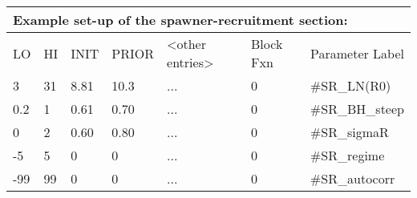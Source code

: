 \begin{center}
	\begin{longtable}{p{1cm} p{1cm} p{1cm}  p{1.5cm}  p{2.5cm}  p{1.5cm}  p{4.5cm}  }
		
		\multicolumn{7}{l}{Example set-up of the spawner-recruitment section:}\\
		\hline
		LO & HI & INIT & PRIOR &  <other entries> & Block Fxn & Parameter Label \\
		\hline
		3    & 31 & 8.81 & 10.3 & ... & 0 & \#SR\_LN(R0) \\
		0.2  & 1  & 0.61 & 0.70 & ... & 0 & \#SR\_BH\_steep \\
		0    & 2  & 0.60 & 0.80 & ... & 0 & \#SR\_sigmaR \\
		-5   & 5  & 0    & 0    & ... & 0 & \#SR\_regime\\
		-99  & 99 & 0    & 0    & ... & 0 & \#SR\_autocorr  \\
		\hline
	\end{longtable}
\end{center}

